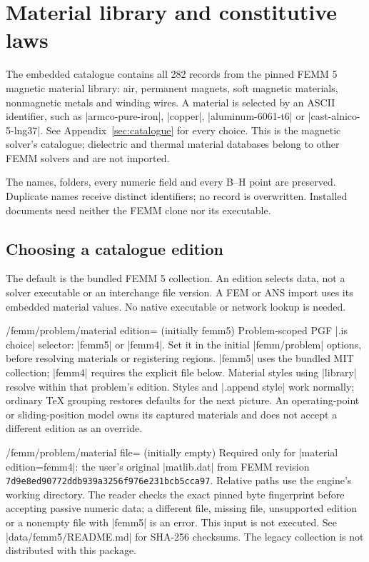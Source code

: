 \section{Material library and constitutive laws}
\label{sec:materials}
The embedded catalogue contains all 282 records from the pinned FEMM 5
magnetic material library: air, permanent magnets, soft magnetic materials,
nonmagnetic metals and winding wires. A material is selected by an ASCII
identifier, such as |armco-pure-iron|, |copper|, |aluminum-6061-t6| or
|cast-alnico-5-lng37|. See Appendix~\ref{sec:catalogue} for every choice.
This is the magnetic solver's catalogue; dielectric and thermal material
databases belong to other FEMM solvers and are not imported.

The names, folders, every numeric field and every B--H point are preserved.
Duplicate names receive distinct identifiers; no record is overwritten. Installed documents need neither the FEMM
clone nor its executable.

\subsection{Choosing a catalogue edition}
The default is the bundled FEMM 5 collection. An edition selects data, not a
solver executable or an interchange file version. A FEM or ANS import uses its
embedded material values. No native executable or network lookup is needed.

\begin{key}{/femm/problem/material edition= (initially femm5)}
Problem-scoped PGF |.is choice| selector: |femm5| or |femm4|. Set it in the
initial |femm/problem| options, before resolving materials or registering regions.
|femm5| uses the bundled MIT collection; |femm4| requires the explicit file below.
Material styles using |library| resolve within that problem's edition.
Styles and |.append style| work normally; ordinary TeX grouping restores defaults
for the next picture. An operating-point or sliding-position model owns its
captured materials and does not accept a different edition as an override.
\end{key}
\begin{key}{/femm/problem/material file= (initially empty)}
Required only for |material edition=femm4|: the user's original |matlib.dat|
from FEMM revision \nolinkurl{7d9e8ed90772ddb939a3256f976e231bcb5cca97}.
Relative paths use the engine's working directory. The reader checks the exact
pinned byte fingerprint before accepting passive numeric data; a different file,
missing file, unsupported edition or a nonempty file with |femm5| is an error.
This input is not executed. See |data/femm5/README.md| for SHA-256 checksums.
The legacy collection is not distributed with this package.
\end{key}

